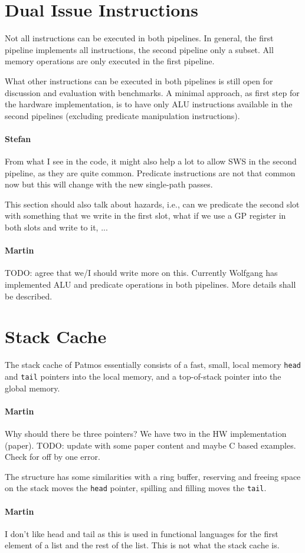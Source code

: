 \documentclass{IEEEtran}
\newcommand{\comment}[3]{\paragraph*{\textbf{#1}}{\color{#3}#2}}
\newcommand{\martin}[1]{\comment{Martin}{#1}{Blue}}
\newcommand{\stefan}[1]{\comment{Stefan}{#1}{RoyalPurple}}
\begin{document}

\section{Dual Issue Instructions}

Not all instructions can be executed in both pipelines. In general, the first
pipeline implements all instructions, the second pipeline only a subset.
All memory operations are only executed in the first pipeline.

What other instructions can be executed in both pipelines is still open for
discussion and evaluation with benchmarks. A minimal approach, as first
step for the hardware implementation, is to have only ALU instructions
available in the second pipelines (excluding predicate manipulation instructions).

\stefan{From what I see in the code, it might also help a lot to allow SWS in the 
second pipeline, as they are quite common. Predicate instructions are not that common 
now but this will change with the new single-path passes.

This section should also talk about hazards, i.e., can we predicate the second
slot with something that we write in the first slot, what if we use a GP register
in both slots and write to it, ... }

\martin{TODO: agree that we/I should write more on this. Currently
Wolfgang has implemented ALU and predicate operations in both
pipelines. More details shall be described.}

\section{Stack Cache}
\label{sec:stack-cache}

The stack cache of Patmos essentially consists of a fast, small, local memory
\texttt{head} and \texttt{tail} pointers into the local memory, and a
top-of-stack pointer into the global memory.
\martin{Why should there be three pointers? We have two in the
HW implementation (paper). TODO: update with some paper content
and maybe C based examples. Check for off by one error.}

The structure has some similarities
with a ring buffer, reserving and freeing space on the stack moves the
\texttt{head} pointer, spilling and filling moves the \texttt{tail}.

\martin{I don't like head and tail as this is used in functional languages for
the first element of a list and the rest of the list. This is not what the stack
cache is.}
\end{document}
